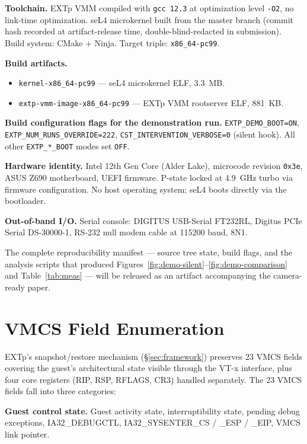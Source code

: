 \documentclass[conference]{IEEEtran}
\begin{document}
\textbf{Toolchain.} EXTp VMM compiled with \texttt{gcc 12.3} at
optimization level \texttt{-O2}, no link-time optimization.
seL4 microkernel built from the master branch (commit hash
recorded at artifact-release time, double-blind-redacted in
submission). Build system: CMake + Ninja. Target triple:
\texttt{x86\_64-pc99}.

\textbf{Build artifacts.}
\begin{itemize}[itemsep=2pt,topsep=2pt,leftmargin=*]
\item \texttt{kernel-x86\_64-pc99} --- seL4 microkernel ELF, 3.3~MB.
\item \texttt{extp-vmm-image-x86\_64-pc99} --- EXTp VMM rootserver
  ELF, 881~KB.
\end{itemize}

\textbf{Build configuration flags for the demonstration run.}
\texttt{EXTP\_DEMO\_BOOT=ON},
\texttt{EXTP\_NUM\_RUNS\_OVERRIDE=222},
\texttt{CST\_INTERVENTION\_VERBOSE=0} (silent hook).
All other \texttt{EXTP\_*\_BOOT} modes set \texttt{OFF}.

\textbf{Hardware identity.} Intel 12th Gen Core (Alder Lake),
microcode revision \texttt{0x3e}, ASUS Z690 motherboard, UEFI
firmware. P-state locked at 4.9~GHz turbo via firmware
configuration. No host operating system; seL4 boots directly via
the bootloader.

\textbf{Out-of-band I/O.} Serial console: DIGITUS USB-Serial
FT232RL, Digitus PCIe Serial DS-30000-1, RS-232 null modem cable
at 115200 baud, 8N1.

The complete reproducibility manifest --- source tree state, build
flags, and the analysis scripts that produced
Figures~\ref{fig:demo-silent}--\ref{fig:demo-comparison} and
Table~\ref{tab:meas} --- will be released as an artifact
accompanying the camera-ready paper.

\section{VMCS Field Enumeration}\label{app:vmcs}

EXTp's snapshot/restore mechanism (\S\ref{sec:framework})
preserves 23 VMCS fields covering the guest's architectural
state visible through the VT-x interface, plus four core
registers (RIP, RSP, RFLAGS, CR3) handled separately. The 23
VMCS fields fall into three categories:

\textbf{Guest control state.} Guest activity state,
interruptibility state, pending debug exceptions, IA32\_DEBUGCTL,
IA32\_SYSENTER\_CS / \_ESP / \_EIP, VMCS link pointer.
\end{document}

